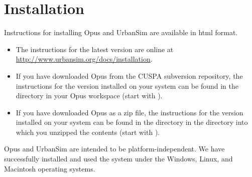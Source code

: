 

\chapter{Installation}
\label{chapter:installation}


Instructions for installing Opus and UrbanSim are available in html
format.  

\begin{itemize}

\item The instructions for the latest version are online at
\url{http://www.urbansim.org/docs/installation}.

\item If you have downloaded Opus from the CUSPA subversion repository, the
instructions for the version installed on your system can be found in the
directory  in your Opus workspace (start
with ).

\item If you have downloaded Opus as a zip file, the instructions for the
version installed on your system can be found in the directory
 in the directory into which you unzipped the
contents (start with ).

\end{itemize}

Opus and UrbanSim are intended to be platform-independent.
 We have successfully installed and used the
system under the Windows, \windowsindex Linux, \linuxindex and Macintosh
\macintoshindex operating systems.


